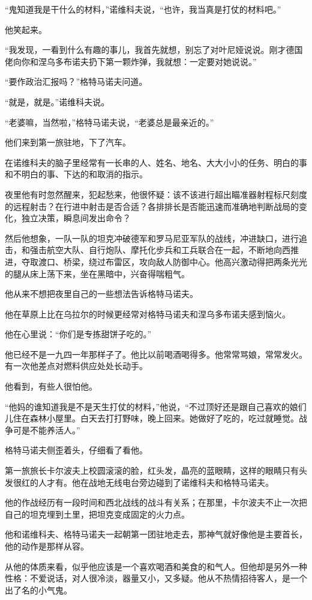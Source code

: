 “鬼知道我是干什么的材料，”诺维科夫说，“也许，我当真是打仗的材料吧。”

他笑起来。

“我发现，一看到什么有趣的事儿，我首先就想，别忘了对叶尼娅说说。刚才德国佬向你和涅乌多布诺夫扔下第一颗炸弹，我就想：一定要对她说说。”

“要作政治汇报吗？”格特马诺夫问道。

“就是，就是。”诺维科夫说。

“老婆嘛，当然啦，”格特马诺夫说，“老婆总是最亲近的。”

他们来到第一旅驻地，下了汽车。

在诺维科夫的脑子里经常有一长串的人、姓名、地名、大大小小的任务、明白的事和不明白的事、下达的和取消的指示。

夜里他有时忽然醒来，犯起愁来，他很怀疑：该不该进行超出瞄准器射程标尺刻度的远程射击？在行进中射击是否合适？各排排长是否能迅速而准确地判断战局的变化，独立决策，瞬息间发出命令？

然后他想象，一队一队的坦克冲破德军和罗马尼亚军队的战线，冲进缺口，进行追击，和强击航空大队、自行炮队、摩托化步兵和工兵联合在一起，不断地向西推进，夺取渡口、桥梁，绕过布雷区，攻向敌人防御中心。他高兴激动得把两条光光的腿从床上荡下来，坐在黑暗中，兴奋得喘粗气。

他从来不想把夜里自己的一些想法告诉格特马诺夫。

他在草原上比在乌拉尔的时候更经常对格特马诺夫和涅乌多布诺夫感到恼火。

他在心里说：“你们是专拣甜饼子吃的。”

他已经不是一九四一年那样子了。他比以前喝酒喝得多。他常常骂娘，常常发火。有一次他差点对燃料供应处处长动手。

他看到，有些人很怕他。

“他妈的谁知道我是不是天生打仗的材料，”他说，“不过顶好还是跟自己喜欢的娘们儿住在森林小屋里。白天去打打野味，晚上回来。她做好了吃的，吃过就睡觉。战争可是不能养活人。”

格特马诺夫侧歪着头，仔细看了看他。

第一旅旅长卡尔波夫上校圆滚滚的脸，红头发，晶亮的蓝眼睛，这样的眼睛只有头发很红的人才有。他在战地无线电台旁边碰到了诺维科夫和格特马诺夫。

他的作战经历有一段时间和西北战线的战斗有关系；在那里，卡尔波夫不止一次把自己的坦克埋到土里，把坦克变成固定的火力点。

他和诺维科夫、格特马诺夫一起朝第一团驻地走去，那神气就好像他是主要首长，他的动作是那样从容。

从他的体质来看，似乎他应该是一个喜欢喝酒和美食的和气人。但他却是另外一种性格：不爱说话，对人很冷淡，器量又小，又多疑。他从不热情招待客人，是一个出了名的小气鬼。

